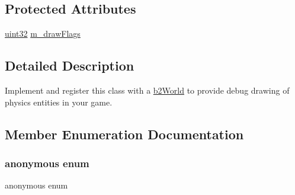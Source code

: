 \subsection*{Protected Attributes}
\begin{DoxyCompactItemize}
\item 
\mbox{\hyperlink{b2_settings_8h_a1134b580f8da4de94ca6b1de4d37975e}{uint32}} \mbox{\hyperlink{classb2_draw_adfcd2e54ddaec6f0a111ec1a1cf8b9a0}{m\+\_\+draw\+Flags}}
\end{DoxyCompactItemize}


\subsection{Detailed Description}
Implement and register this class with a \mbox{\hyperlink{classb2_world}{b2\+World}} to provide debug drawing of physics entities in your game. 

\subsection{Member Enumeration Documentation}
\mbox{\label{classb2_draw_ae23c5d6c4f5230621f736593469cf7f2}} 
\subsubsection{\texorpdfstring{anonymous enum}{anonymous enum}}
{\footnotesize\ttfamily anonymous enum}


